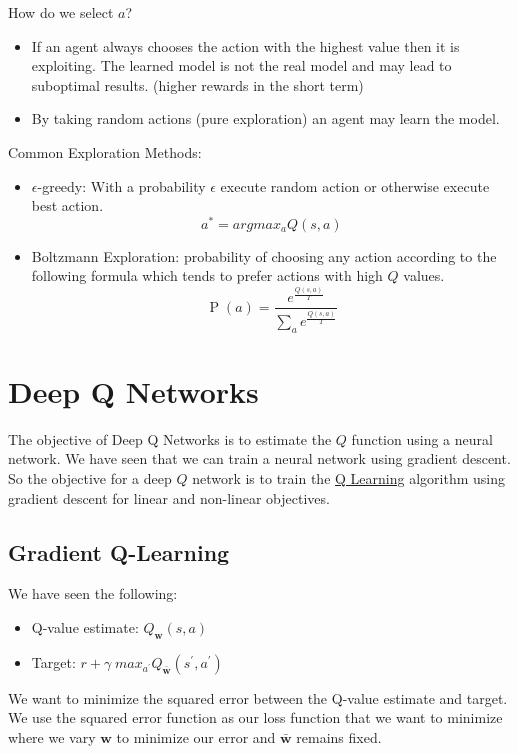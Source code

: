 \documentclass[12pt]{article}
\begin{document}
            How do we select $a$?
            \begin{itemize}
                \item If an agent always chooses the action with the highest value then it is exploiting. The learned model is not
                the real model and may lead to suboptimal results. (higher rewards in the short term)
                \item By taking random actions (pure exploration) an agent may learn the model. 
            \end{itemize}

            Common Exploration Methods:
            \begin{itemize}
                \item $\epsilon$-greedy: With a probability $\epsilon$ execute random action or otherwise execute best action.
                $$ a^* = argmax_a Q(s,a) $$
                \item Boltzmann Exploration: probability of choosing any action according to the following formula which
                tends to prefer actions with high $Q$ values.
                $$ \operatorname{P}(a)=\frac{e^{\frac{Q(s, a)}{T}}}{\sum_{a} e^{\frac{Q(s, a)}{T}}} $$ 
            \end{itemize}

\section{Deep Q Networks}
    The objective of Deep Q Networks is to estimate the $Q$ function using a neural network. We have seen that we can
    train a neural network using gradient descent. So the objective for a deep $Q$ network is to train the
    \hyperref[QLearning]{Q Learning} algorithm using gradient descent for linear and non-linear objectives.
    
    \subsection{Gradient Q-Learning}
        We have seen the following:
        \begin{itemize}
            \item Q-value estimate: $Q_{\boldsymbol{w}}(s,a)$ 
            \item Target: $r + \gamma \; max_{a^{\prime}} Q_{\boldsymbol{\bar{w}}}(s^{\prime}, a^{\prime})$
        \end{itemize}

        We want to minimize the squared error between the Q-value estimate and target. We use the squared error function
        as our loss function that we want to minimize where we vary $\boldsymbol{w}$ to minimize our error and
        $\bar{\boldsymbol{w}}$ remains fixed.
\end{document}
